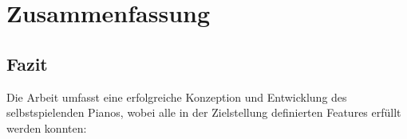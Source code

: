 
\chapter{Zusammenfassung} \label{fazit}
\nocite{*}
\section{Fazit}
Die Arbeit umfasst eine erfolgreiche Konzeption und Entwicklung des selbstspielenden Pianos, wobei alle in der Zielstellung
definierten Features erfüllt werden konnten: \newline

